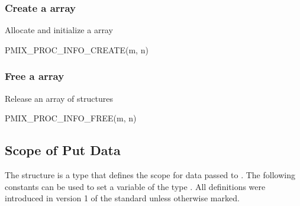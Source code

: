 \begin{arglist}
\end{arglist}

\subsubsection{Create a  array}

Allocate and initialize a  array

\cspecificstart
\begin{codepar}
PMIX_PROC_INFO_CREATE(m, n)
\end{codepar}
\cspecificend

\begin{arglist}
\end{arglist}

\subsubsection{Free a array}

Release an array of  structures

\cspecificstart
\begin{codepar}
PMIX_PROC_INFO_FREE(m, n)
\end{codepar}
\cspecificend

\begin{arglist}
\end{arglist}


\subsection{Scope of Put Data}

The  structure is a  type that defines the scope for data passed to .
The following constants can be used to set a variable of the type . All definitions were introduced in version 1 of the standard unless otherwise marked.

